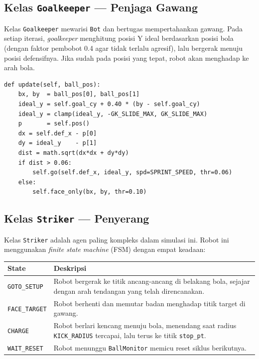 \documentclass{article}
\begin{document}
\subsection{Kelas \texttt{Goalkeeper} — Penjaga Gawang}

Kelas \texttt{Goalkeeper} mewarisi \texttt{Bot} dan bertugas mempertahankan
gawang. Pada setiap iterasi, \textit{goalkeeper} menghitung posisi Y ideal
berdasarkan posisi bola (dengan faktor pembobot 0.4 agar tidak terlalu agresif),
lalu bergerak menuju posisi defensifnya. Jika sudah pada posisi yang tepat,
robot akan menghadap ke arah bola.

\begin{verbatim}
def update(self, ball_pos):
    bx, by  = ball_pos[0], ball_pos[1]
    ideal_y = self.goal_cy + 0.40 * (by - self.goal_cy)
    ideal_y = clamp(ideal_y, -GK_SLIDE_MAX, GK_SLIDE_MAX)
    p       = self.pos()
    dx = self.def_x - p[0]
    dy = ideal_y    - p[1]
    dist = math.sqrt(dx*dx + dy*dy)
    if dist > 0.06:
        self.go(self.def_x, ideal_y, spd=SPRINT_SPEED, thr=0.06)
    else:
        self.face_only(bx, by, thr=0.10)
\end{verbatim}

\subsection{Kelas \texttt{Striker} — Penyerang}

Kelas \texttt{Striker} adalah agen paling kompleks dalam simulasi ini.
Robot ini menggunakan \textit{finite state machine} (FSM) dengan empat keadaan:

\begin{center}
\begin{tabular}{@{}lp{10cm}@{}}
\toprule
\textbf{State} & \textbf{Deskripsi} \\
\midrule
\texttt{GOTO\_SETUP}  & Robot bergerak ke titik ancang-ancang di belakang bola, sejajar dengan arah tendangan yang telah direncanakan. \\
\texttt{FACE\_TARGET} & Robot berhenti dan memutar badan menghadap titik target di gawang. \\
\texttt{CHARGE}       & Robot berlari kencang menuju bola, menendang saat radius \texttt{KICK\_RADIUS} tercapai, lalu terus ke titik \texttt{stop\_pt}. \\
\texttt{WAIT\_RESET}  & Robot menunggu \texttt{BallMonitor} memicu reset siklus berikutnya. \\
\bottomrule
\end{tabular}
\end{center}
\end{document}
